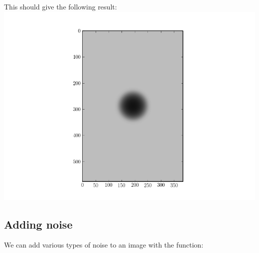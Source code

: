 \documentclass[letterpaper,10pt,english]{manual}
\begin{document}
This should give the following result:
\includegraphics[width=400pt]{refimg.png}

\subsection{Adding noise}

We can add various types of noise to an image with the  function:
\end{document}
